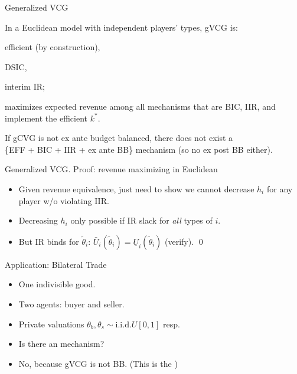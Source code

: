 \documentclass[english,10pt
,aspectratio=169
]{beamer}
\begin{document}
\begin{frame}{Generalized VCG}
	\begin{theorem}
		In a \alert{Euclidean} model with independent players' types, gVCG is:
		\begin{itemize}{\color{gray}
				\item efficient (by construction),
				\item DSIC,
				\item interim IR;}
			\item maximizes expected revenue among all mechanisms that are BIC, IIR, and implement the efficient $k^*$.
		\end{itemize}
	\end{theorem}
	If gCVG is not ex ante budget balanced, there does not exist a \\
	\{EFF + BIC + IIR + ex ante BB\} mechanism (so no ex post BB either).
\end{frame}


\begin{frame}{Generalized VCG. Proof: revenue maximizing in Euclidean}
\begin{itemize}
	\item Given revenue equivalence, just need to show we cannot decrease $h_i$ for any player w/o violating IIR.
	\pause
	\item Decreasing $h_i$ only possible if IR slack for \emph{all} types of $i$.
	\pause
	\item But IR binds for $\tilde{\theta}_i$: $\bar{U}_i (\tilde{\theta}_i) = \underline{U}_i (\tilde{\theta}_i)$ (verify). \qed
\end{itemize}
\end{frame}


\begin{frame}{Application: Bilateral Trade}
	\begin{example}
		\begin{itemize}
			\item One indivisible good.
			\item Two agents: buyer and seller. 
			\item Private valuations $\theta_b,\theta_s \sim \text{i.i.d.} U[0,1]$ resp.
			\item Is there an 
			 mechanism?
		\end{itemize}
	\end{example}
	\begin{itemize}
		\item No, because gVCG is not BB. 
		(This is the )
	\end{itemize}
\end{frame}
\end{document}
